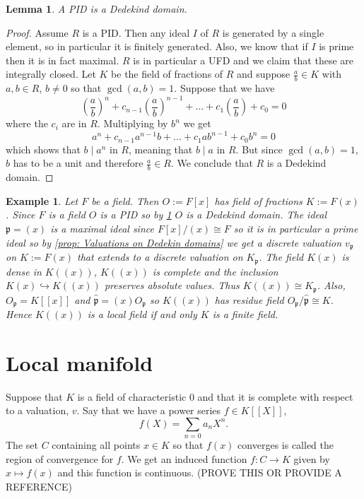 \documentclass{article}
\newtheorem{lemma}{Lemma}[section]
\newtheorem{example}{Example}[section]
\newcommand{\mfrak}[1]{\mathfrak{#1}}
\begin{document}
 
\begin{lemma} \label{lem: PID is Dedekin}
    A PID is a Dedekind domain.
\end{lemma}
\begin{proof}
    Assume $R$ is a PID. Then any ideal $I$ of $R$ is generated by a single element, so in particular it is finitely generated. Also, we know that if $I$ is prime then it is in fact maximal. $R$ is in particular a UFD and we claim that these are integrally closed. Let $K$ be the field of fractions of $R$ and suppose $\frac{a}{b} \in K$ with $a,b \in R$, $b \neq 0$ so that $\gcd(a, b) = 1$. Suppose that we have
    $$(\frac{a}{b})^n + c_{n-1}(\frac{a}{b})^{n-1} + ... + c_{1}(\frac{a}{b}) + c_0 = 0$$
    where the $c_i$ are in $R$. Multiplying by $b^n$ we get
    $$a^n + c_{n-1}a^{n-1}b + ... + c_{1}ab^{n-1} + c_0 b^n = 0$$
    which shows that $b \mid a^n$ in $R$, meaning that $b \mid a$ in $R$. But since $\gcd(a,b) = 1$, $b$ has to be a unit and therefore $\frac{a}{b} \in R$. We conclude that $R$ is a Dedekind domain. 
\end{proof}


\begin{example}
    Let $F$ be a field. Then $O := F[x]$ has field of fractions $K := F(x)$. Since $F$ is a field $O$ is a PID so by \cref{lem: PID is Dedekin} $O$ is a Dedekind domain. The ideal $\mfrak p = (x)$ is a maximal ideal since $F[x] / (x) \cong F$ so it is in particular a prime ideal so by \cref{prop: Valuations on Dedekin domains} we get a discrete valuation $v_\mfrak p$ on $K := F(x)$ that extends to a discrete valuation on $K_\mfrak p$. The field $K(x)$ is dense in $K((x))$, $K((x))$ is complete and the inclusion $K(x) \hookrightarrow K((x))$ preserves absolute values. Thus $K((x)) \cong K_\mfrak p$. Also, $O_\mfrak p = K[[x]]$ and $\hat {\mfrak p} = (x)O_\mfrak p$ so $K((x))$ has residue field $O_\mfrak p / \hat {\mfrak p} \cong K$. Hence $K((x))$ is a local field if and only $K$ is a finite field. 
\end{example}



\section{Local manifold}

Suppose that $K$ is a field of characteristic 0 and that it is complete with respect to a valuation, $v$. Say that we have a power series $f \in K[[X]]$,  
$$f(X) = \sum_{n = 0} a_n X^n.$$
The set $C$ containing all points $x \in K$ so that $f(x)$ converges is called the region of convergence for $f$. 
We get an induced function $f : C \to K$ given by $x \mapsto f(x)$ and this function is continuous. (PROVE THIS OR PROVIDE A REFERENCE) 
\end{document}
